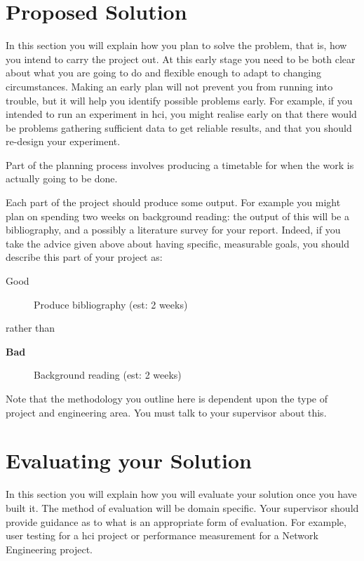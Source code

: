 \documentclass[11pt, a4paper, twoside, openright]{article}
\begin{document}
\section{Proposed Solution}

In this section you will explain how you plan to solve the problem, that is, how you intend to carry the project out. At this early stage you need to be both clear about what you are going to do and flexible enough to adapt to changing circumstances. Making an early plan will not prevent you from running into trouble, but it will help you identify possible problems early. For example, if you intended to run an experiment in \gls{hci}, you might realise early on that there would be problems gathering sufficient data to get reliable results, and that you should re-design your experiment.

Part of the planning process involves producing a timetable for when
the work is actually going to be done.

Each part of the project should produce some output. For example you
might plan on spending two weeks on background reading: the output of
this will be a bibliography, and a possibly a literature survey for
your report. Indeed, if you take the advice given above about having
specific, measurable goals, you should describe this part of your
project as:

\begin{description}
	\item[Good] Produce bibliography (est: 2 weeks)
\end{description}
rather than
\begin{description}
	\item[\bf Bad] Background reading (est: 2 weeks)
\end{description}

Note that the methodology you outline here is dependent upon the type
of project and engineering area. You must talk to your supervisor
about this.

\section{Evaluating your Solution}

In this section you will explain how you will evaluate your solution
once you have built it. The method of evaluation will be domain
specific. Your supervisor should provide guidance as to what is an
appropriate form of evaluation. For example, user testing for a \gls{hci} project or performance measurement for a Network Engineering project.
\end{document}
